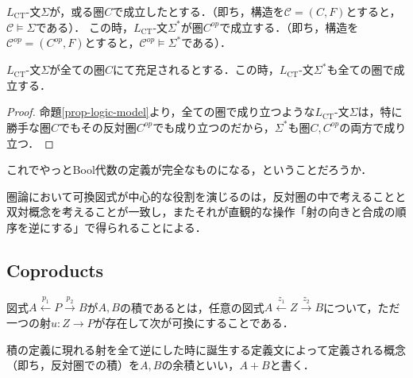 \documentclass[uplatex, dvipdfmx]{jsarticle}
\begin{document}
\begin{proposition*}\label{prop-logic-model}
    $L_{\mathrm{CT}}$-文$\Sigma$が，或る圏$C$で成立したとする．（即ち，構造を$\mathcal{C}=(C,F)$とすると，$\mathcal{C}\models\Sigma$である）．
    この時，$L_{\mathrm{CT}}$-文$\Sigma^*$が圏$C^{op}$で成立する．（即ち，構造を$\mathcal{C}^{op}=(C^{op},F)$とすると，$\mathcal{C}^{op}\models\Sigma^*$である）．
\end{proposition*}

\begin{proposition}\label{prop-duality-conceptual}
    $L_{\mathrm{CT}}$-文$\Sigma$が全ての圏$C$にて充足されるとする．この時，$L_{\mathrm{CT}}$-文$\Sigma^*$も全ての圏で成立する．
\end{proposition}
\begin{proof}
    命題\ref{prop-logic-model}より，全ての圏で成り立つような$L_{\mathrm{CT}}$-文$\Sigma$は，特に勝手な圏$C$でもその反対圏$C^{op}$でも成り立つのだから，$\Sigma^*$も圏$C,C^{op}$の両方で成り立つ．
\end{proof}

\begin{screen}
    これでやっとBool代数の定義が完全なものになる，ということだろうか．

    圏論において可換図式が中心的な役割を演じるのは，反対圏の中で考えることと双対概念を考えることが一致し，またそれが直観的な操作「射の向きと合成の順序を逆にする」で得られることによる．
\end{screen}

\subsection{Coproducts}

\begin{definition}[product]
    図式$A\xleftarrow{p_1}P\xrightarrow{p_2}B$が$A,B$の積であるとは，任意の図式$A\xleftarrow{z_1}Z\xrightarrow{z_2}B$について，ただ一つの射$u:Z\to P$が存在して次が可換にすることである．
    \begin{center}
    \end{center}
\end{definition}
\begin{definition*}
    積の定義に現れる射を全て逆にした時に誕生する定義文によって定義される概念（即ち，反対圏での積）を$A,B$の余積といい，$A+B$と書く．
\end{definition*}
\end{document}
